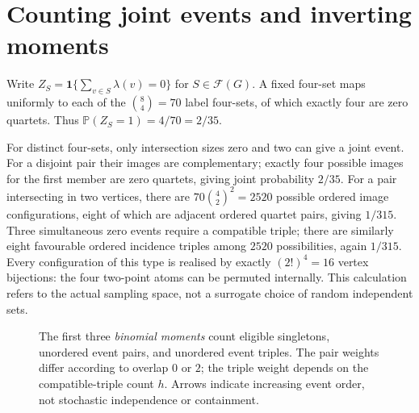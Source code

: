 \documentclass[12pt,a4paper]{article}
\newcommand{\cF}{\mathcal F}
\newcommand{\PP}{\mathbb P}
\newcommand{\bin}[2]{\binom{#1}{#2}}
\begin{document}
\section{Counting joint events and inverting moments}\label{sec:law}
Write $Z_S=\mathbf1\{\sum_{v\in S}\lambda(v)=0\}$ for $S\in\cF(G)$. A fixed four-set maps uniformly to each of the $\bin84=70$ label four-sets, of which exactly four are zero quartets. Thus $\PP(Z_S=1)=4/70=2/35$.

For distinct four-sets, only intersection sizes zero and two can give a joint event. For a disjoint pair their images are complementary; exactly four possible images for the first member are zero quartets, giving joint probability $2/35$. For a pair intersecting in two vertices, there are $70\bin42^2=2520$ possible ordered image configurations, eight of which are adjacent ordered quartet pairs, giving $1/315$. Three simultaneous zero events require a compatible triple; there are similarly eight favourable ordered incidence triples among $2520$ possibilities, again $1/315$. Every configuration of this type is realised by exactly $(2!)^4=16$ vertex bijections: the four two-point atoms can be permuted internally. This calculation refers to the actual sampling space, not a surrogate choice of random independent sets.

\begin{figure}[htbp]\centering
{}
\caption{The first three \emph{binomial moments} count eligible singletons, unordered event pairs, and unordered event triples. The pair weights differ according to overlap $0$ or $2$; the triple weight depends on the compatible-triple count $h$. Arrows indicate increasing event order, not stochastic independence or containment.}\label{fig:moments}
\end{figure}
\end{document}
